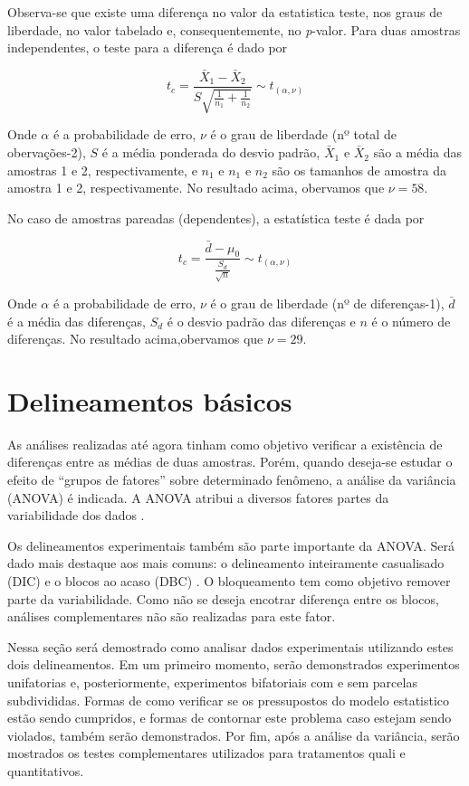 \documentclass[
]{book}
\begin{document}

Observa-se que existe uma diferença no valor da estatistica teste, nos graus de liberdade, no valor tabelado e, consequentemente, no \emph{p}-valor. Para duas amostras independentes, o teste para a diferença é dado por

\[
{t_c} = \frac{{{{\bar X}_1} - {{\bar X}_2}}}{{S\sqrt {\frac{1}{{{n_1}}} + \frac{1}{{{n_2}}}} }} \sim {t_{\left( {\alpha ,\nu } \right)}}
\]

Onde \(\alpha\) é a probabilidade de erro, \(\nu\) é o grau de liberdade (nº total de obervações-2), \(S\) é a média ponderada do desvio padrão, \({\bar X}_1\) e \({\bar X}_2\) são a média das amostras 1 e 2, respectivamente, e \(n_1\) e \(n_1\) e \(n_2\) são os tamanhos de amostra da amostra 1 e 2, respectivamente. No resultado acima, obervamos que \(\nu = 58\).

No caso de amostras pareadas (dependentes), a estatística teste é dada por 

\[
{t_c} = \frac{{\bar d - {\mu _0}}}{{\frac{{{S_d}}}{{\sqrt n }}}} \sim {t_{\left( {\alpha ,\nu } \right)}} 
\]

Onde \(\alpha\) é a probabilidade de erro, \(\nu\) é o grau de liberdade (nº de diferenças-1), \(\bar d\) é a média das diferenças, \(S_d\) é o desvio padrão das diferenças e \(n\) é o número de diferenças. No resultado acima,obervamos que \(\nu = 29\).

\hypertarget{dbasic}{%
\section{Delineamentos básicos}\label{dbasic}}

As análises realizadas até agora tinham como objetivo verificar a existência de diferenças entre as médias de duas amostras. Porém, quando deseja-se estudar o efeito de ``grupos de fatores'' sobre determinado fenômeno, a análise da variância (ANOVA) é indicada. A ANOVA atribui a diversos fatores partes da variabilidade dos dados \citep{Casella2008}. 

Os delineamentos experimentais também são parte importante da ANOVA. Será dado mais destaque aos mais comuns: o delineamento inteiramente casualisado (DIC)  e o blocos ao acaso (DBC) . O bloqueamento tem como objetivo remover parte da variabilidade. Como não se deseja encotrar diferença entre os blocos, análises complementares não são realizadas para este fator.

Nessa seção será demostrado como analisar dados experimentais utilizando estes dois delineamentos. Em um primeiro momento, serão demonstrados experimentos unifatorias e, posteriormente, experimentos bifatoriais com e sem parcelas subdivididas. Formas de como verificar se os pressupostos  do modelo estatistico estão sendo cumpridos, e formas de contornar este problema caso estejam sendo violados, também serão demonstrados. Por fim, após a análise da variância, serão mostrados os testes complementares utilizados para tratamentos quali e quantitativos.
\end{document}
